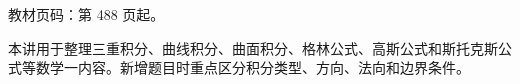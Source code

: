 
\begin{knowledgeBox}
教材页码：第 488 页起。

本讲用于整理三重积分、曲线积分、曲面积分、格林公式、高斯公式和斯托克斯公式等数学一内容。新增题目时重点区分积分类型、方向、法向和边界条件。
\end{knowledgeBox}
